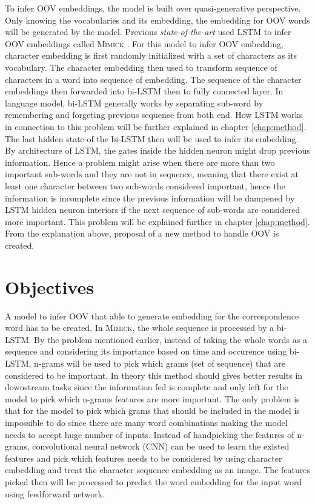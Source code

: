     To infer OOV embeddings, the model is built over quasi-generative
    perspective. Only knowing the vocabularies and its embedding, the
    embedding for OOV words will be generated by the model. Previous
    \textit{state-of-the-art} used LSTM to infer OOV embeddings called
    \textsc{Mimick} \citep{mimicking2017Pinter}. For this model to
    infer OOV embedding, character embedding is first randomly
    initialized with a set of characters as its vocabulary. The
    character embedding then used to transform sequence of characters
    in a word into sequence of embedding. The sequence of the
    character embeddings then forwarded into bi-LSTM then to fully
    connected layer. In language model, bi-LSTM generally works by
    separating sub-word by remembering and forgeting previous sequence
    from both end. How LSTM works in connection to this problem will
    be further explained in chapter \ref{chap:method}. The last hidden
    state of the bi-LSTM then will be used to infer its embedding. By
    architecture of LSTM, the gates inside the hidden neuron might
    drop previous information. Hence a problem might arise when there
    are more than two important sub-words and they are not in
    sequence, meaning that there exist at least one character between
    two sub-words considered important, hence the information is
    incomplete since the previous information will be dampened by LSTM
    hidden neuron interiors if the next sequence of sub-words are
    considered more important. This problem will be explained further
    in chapter \ref{chap:method}. From the explanation above, proposal
    of a new method to handle OOV is created.

\section{Objectives}
    A model to infer OOV that able to generate embedding for the
    correspondence word has to be created. In \textsc{Mimick}, the
    whole sequence is processed by a bi-LSTM. By the problem mentioned
    earlier, instead of taking the whole words as a sequence and
    considering its importance based on time and occurence using
    bi-LSTM, n-grams will be used to pick which grams (set of
    sequence) that are considered to be important. In theory this
    method should gives better results in downstream tasks since the
    information fed is complete and only left for the model to pick which
    n-grams features are more important. The only problem is that for
    the model to pick which grams that should be included in the model
    is impossible to do since there are many word combinations making
    the model needs to accept huge number of inputs. Instead of
    handpicking the features of n-grams, convolutional neural network
    (CNN) can be used to learn the existed features and pick which
    features needs to be considered by using character embedding and
    treat the character sequence embedding as an image. The features
    picked then will be processed to predict the word embedding for
    the input word using feedforward network.

